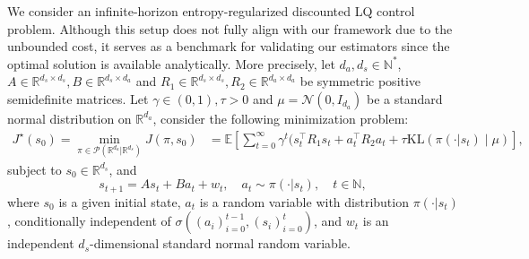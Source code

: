 \documentclass[11pt]{article}
\numberwithin{equation}{section}
\theoremstyle{definition}
\theoremstyle{remark}
\def\N{{\mathbb{N}}}
\def\R{{\mathbb R}}
\begin{document}
We   consider an 
infinite-horizon
entropy-regularized  discounted  LQ   control problem. 
Although this setup does not fully align with our framework due to the unbounded cost, it serves as a benchmark for validating our estimators since the optimal solution is available analytically.
More precisely, let  $d_a, d_s \in \N^*$,   $A \in \R^{d_s \times d_s}, B \in \R^{d_s \times d_a} $ and $ R_1 \in \R^{d_s \times d_s}, R_2 \in \R^{d_a \times d_a}$ be  symmetric positive semidefinite matrices.  Let
$\gamma \in (0,1), \tau > 0$ and $\mu = \mathcal N (0, I_{d_a})$
be a standard   normal distribution on $\mathbb R^{d_a}$,
consider the following minimization problem:
\begin{equation}
    \label{eq:infinite-horizon-lqg}
    \begin{aligned}
        J^\star(s_0)=\min_{\pi \in \mathcal P (\R^{d_a} | \R^{d_s})} J(\pi,s_0) & = \mathbb E \left[ \sum_{t = 0}^{\infty} \gamma^t(s_t^\top R_1 s_t + a_t ^\top R_2 a_t + \tau \mathrm{KL}\left(\pi(\cdot | s_t) \mid \mu\right) \right], 
    \end{aligned}
\end{equation}
subject to  
$s_0  \in \R^{d_s}$,
and  
$$ 
 s_{t + 1}                                       = A s_t + B a_t + w_t, 
\quad 
 a_t\sim \pi(\cdot|s_t),
\quad t \in \N,
$$ 
where $s_0$
is a given initial state, 
$a_t $ is a random  variable 
with distribution $\pi(\cdot|s_t)$,  conditionally independent of $\sigma((a_i)_{i=0}^{t-1}, (s_i)_{i=0}^t)$,
and 
$w_t$ is an independent $d_s$-dimensional standard normal random variable. 
\end{document}
